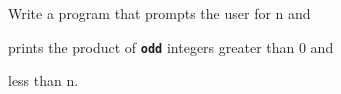 Write a program that prompts the user for n and

prints the product of \texttt{\textbf{odd}} integers greater than 0 and

less than n.

